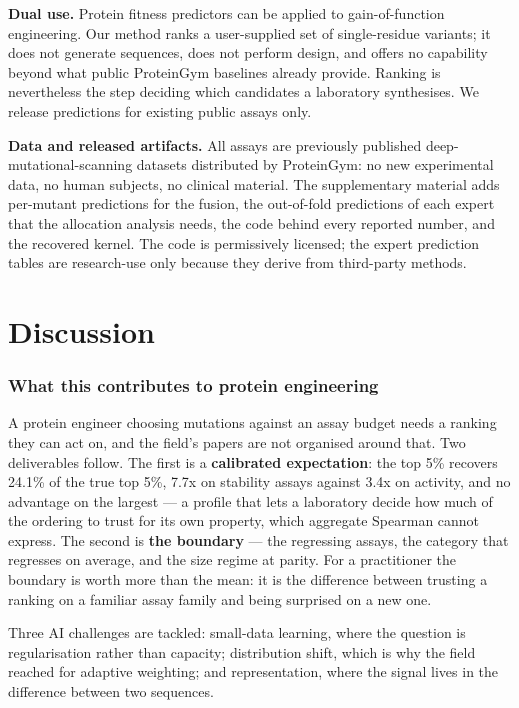 \documentclass{article}
\begin{document}
\textbf{Dual use.} Protein fitness predictors can be applied to gain-of-function engineering. Our method ranks
a user-supplied set of single-residue variants; it does not generate sequences, does not perform design,
and offers no capability beyond what public ProteinGym baselines already provide. Ranking is nevertheless
the step deciding which candidates a laboratory synthesises. We release predictions for existing public
assays only.

\textbf{Data and released artifacts.} All assays are previously published deep-mutational-scanning datasets distributed
by ProteinGym: no new experimental data, no human subjects, no clinical material. The supplementary material adds per-mutant predictions
for the fusion, the out-of-fold predictions of each expert that the allocation analysis needs, the code behind every
reported number, and the recovered kernel. The code is permissively licensed; the expert prediction tables are research-use only because they derive from
third-party methods.

\section{Discussion}\label{discussion}

\subsubsection*{What this contributes to protein engineering}\label{what-this-contributes-to-protein-engineering}

A protein engineer choosing mutations against an assay budget needs a ranking they can act on, and the field's
papers are not organised around that. Two deliverables follow. The first is a \textbf{calibrated expectation}: the top 5\% recovers
24.1\% of the true top 5\%, 7.7x on stability assays against 3.4x on activity, and no advantage on the largest --- a profile that lets a laboratory decide how much of the ordering to trust for its own property, which
aggregate Spearman cannot express. The second is \textbf{the boundary} --- the regressing assays, the category that regresses on average, and the size
regime at parity. For a practitioner the boundary is worth more than the mean: it is the difference between
trusting a ranking on a familiar assay family and being surprised on a new one.

Three AI challenges are tackled: small-data learning, where the question is regularisation rather than capacity;
distribution shift, which is why the field reached for adaptive weighting; and representation, where the signal
lives in the difference between two sequences.
\end{document}

